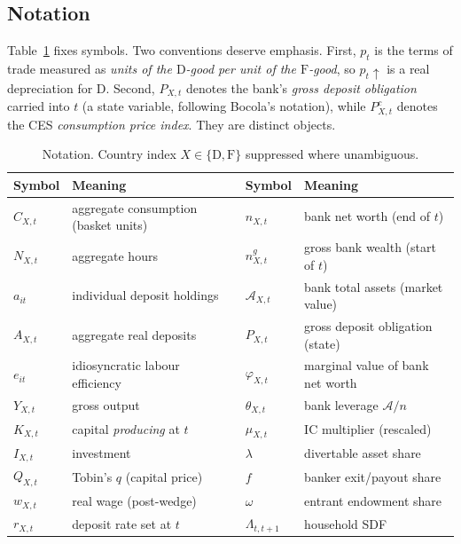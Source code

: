\documentclass[11pt]{article}
\numberwithin{equation}{section}
\newcommand{\D}{\mathrm{D}}
\newcommand{\F}{\mathrm{F}}
\theoremstyle{definition}
\theoremstyle{plain}
\theoremstyle{remark}
\begin{document}
\subsection{Notation}

Table~\ref{tab:notation} fixes symbols. Two conventions deserve emphasis. First,
$p_t$ is the terms of trade measured as \emph{units of the $\D$-good per unit of the
$\F$-good}, so $p_t\uparrow$ is a real depreciation for $\D$. Second, $P_{X,t}$
denotes the bank's \emph{gross deposit obligation} carried into $t$ (a state
variable, following Bocola's notation), while $P^{c}_{X,t}$ denotes the CES
\emph{consumption price index}. They are distinct objects.

\begin{table}[htbp]
\centering
\small
\caption{Notation. Country index $X\in\{\D,\F\}$ suppressed where unambiguous.}
\label{tab:notation}
\begin{tabular}{@{}ll@{\qquad}ll@{}}
\toprule
Symbol & Meaning & Symbol & Meaning \\
\midrule
$C_{X,t}$        & aggregate consumption (basket units) & $n_{X,t}$      & bank net worth (end of $t$)\\
$N_{X,t}$        & aggregate hours                      & $n^{g}_{X,t}$  & gross bank wealth (start of $t$)\\
$a_{it}$         & individual deposit holdings          & $\mathcal{A}_{X,t}$ & bank total assets (market value)\\
$A_{X,t}$        & aggregate real deposits              & $P_{X,t}$      & gross deposit obligation (state)\\
$e_{it}$         & idiosyncratic labour efficiency      & $\varphi_{X,t}$ & marginal value of bank net worth\\
$Y_{X,t}$        & gross output                         & $\theta_{X,t}$  & bank leverage $\mathcal{A}/n$\\
$K_{X,t}$        & capital \emph{producing} at $t$       & $\mu_{X,t}$     & IC multiplier (rescaled)\\
$I_{X,t}$        & investment                           & $\lambda$       & divertable asset share\\
$Q_{X,t}$        & Tobin's $q$ (capital price)          & $f$             & banker exit/payout share\\
$w_{X,t}$        & real wage (post-wedge)               & $\omega$        & entrant endowment share\\
$r_{X,t}$        & deposit rate set at $t$              & $\Lambda_{t,t+1}$ & household SDF\\

\end{tabular}
\end{table}
\end{document}
